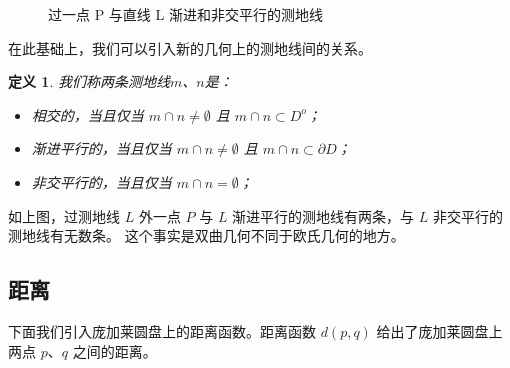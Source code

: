 \documentclass[a4paper,12pt]{article}
\newtheorem{definition}{定义}
\begin{document}
\begin{figure}[ht]
\centering
{}
\caption{过一点 P 与直线 L 渐进和非交平行的测地线}
\end{figure}

在此基础上，我们可以引入新的几何上的测地线间的关系。

\begin{definition}
\label{d2}
我们称两条测地线$m$、$n$是：
\begin{itemize}
\item 相交的，当且仅当 $ m \cap n \neq \emptyset $ 且 $ m \cap n \subset D^o $；
\item 渐进平行的，当且仅当 $ m \cap n \neq \emptyset $ 且 $  m \cap n \subset \partial D $；
\item 非交平行的，当且仅当 $ m \cap n = \emptyset $；
\end{itemize}
\end{definition}

如上图，过测地线 $L$ 外一点 $P$ 与 $L$ 渐进平行的测地线有两条，与 $L$ 非交平行的测地线有无数条。
这个事实是双曲几何不同于欧氏几何的地方。

\newpage

\subsection{距离}

下面我们引入庞加莱圆盘上的距离函数。距离函数 $d(p, q)$ 给出了庞加莱圆盘上两点 $p$、$q$ 之间的距离。
\end{document}
